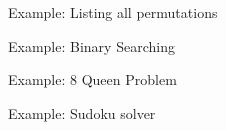 \documentclass[10pt,xcolor={table,dvipsnames},t]{beamer}
\begin{document}
\begin{frame}{Example: Listing all permutations}
  
\end{frame}



\begin{frame}{Example: Binary Searching}
  
\end{frame}


\begin{frame}{Example: 8 Queen Problem}
  
\end{frame}

\begin{frame}{Example: Sudoku solver}
  

\end{frame}
\end{document}
